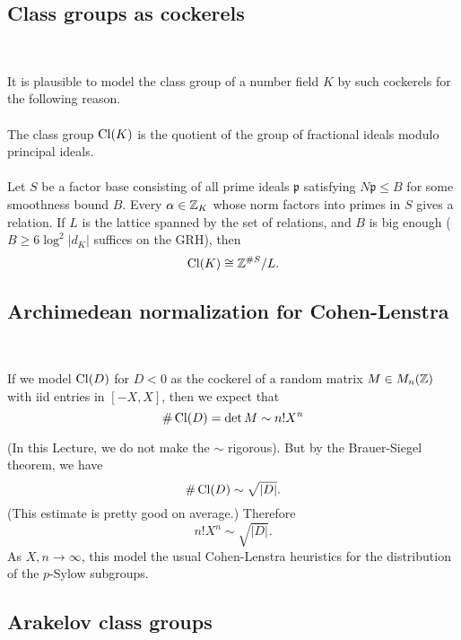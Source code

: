 \documentclass[12pt,amsfont]{amsart}
\begin{document}
\subsection{Class groups as cockerels}
{\ }

It is plausible to model the class group of a number field $K$ by such cockerels for the following reason. \\ \\
The class group $\operatorname{Cl}(K)$ is the quotient of the group of fractional ideals modulo principal ideals. \\ \\
Let $S$ be a factor base consisting of all prime ideals $\mathfrak{p}$ satisfying $N \mathfrak{p} \leq B$ for some smoothness bound $B$. Every $\alpha \in {\mathbb Z}_K$ whose norm factors into primes in $S$ gives a relation. If $L$ is the lattice spanned by the set of relations, and $B$ is big enough ($B \geq 6 \log^2 |d_K|$ suffices on the GRH), then
\[\operatorname{Cl}(K) \cong {\mathbb Z}^{\# S} /L. \]
\subsection{Archimedean normalization for Cohen-Lenstra}
{\ }

If we model $\operatorname{Cl}(D)$ for $D < 0$ as the cockerel of a random matrix $M \in M_n({\mathbb Z})$ with iid entries in $[-X,X]$, then we expect that
\[ \#\operatorname{Cl}(D) = \det M \sim n! X^n \]

(In this Lecture, we do not make the $\sim$ rigorous). But by the Brauer-Siegel theorem, we have
\[ \#\operatorname{Cl}(D) \sim \sqrt{|D|} .\]
(This estimate is pretty good on average.) Therefore
\[n! X^n \sim \sqrt{|D|}.\]
As $X, n \rightarrow \infty$, this model the usual Cohen-Lenstra heuristics for the distribution of the $p$-Sylow subgroups. 


\subsection{Arakelov class groups}
{\ }
\end{document}
